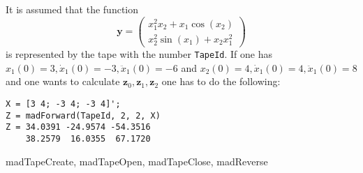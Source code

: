 \begin{Examples}
It is assumed that the function
\begin{equation*}
\mathbf{y} = 
\begin{pmatrix}
x_1^2x_2 + x_1\cos(x_2)\\
x_2^2\sin(x_1) + x_2x_1^2
\end{pmatrix}
\end{equation*}
is represented by the tape with the number \texttt{TapeId}. If one has $x_1(0) = 3, \dot x_1(0) = -3, \ddot x_1(0) = -6$ and $x_2(0) = 4, \dot x_1(0) = 4, \ddot x_1(0) = 8$ and one wants to calculate $\mathbf{z}_0, \mathbf{z}_1, \mathbf{z}_2$ one has to do the following:
\begin{verbatim}
X = [3 4; -3 4; -3 4]';
Z = madForward(TapeId, 2, 2, X)
Z = 34.0391 -24.9574 -54.3516
    38.2579  16.0355  67.1720
\end{verbatim}
\end{Examples}




\begin{Seealso}
madTapeCreate, madTapeOpen, madTapeClose, madReverse
\end{Seealso}



